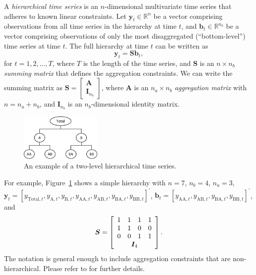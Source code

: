 \documentclass[
  11pt]{article}
\begin{document}
A \emph{hierarchical time series} is an \(n\)-dimensional multivariate
time series that adheres to known linear constraints. Let
\(\bm{y}_t \in \mathbb{R}^n\) be a vector comprising observations from
all time series in the hierarchy at time \(t\), and
\(\bm{b}_t \in \mathbb{R}^{n_b}\) be a vector comprising observations of
only the most disaggregated (``bottom-level'') time series at time
\(t\). The full hierarchy at time \(t\) can be written as \[
\bm{y}_t = \bm{S}\bm{b}_t,
\] for \(t=1,2,\ldots,T\), where \(T\) is the length of the time series,
and \(\bm{S}\) is an \(n \times n_b\) \emph{summing matrix} that defines
the aggregation constraints. We can write the summing matrix as
\(\bm{S} = \left[\begin{array}{c}\bm{A} \\ \bm{I}_{n_b}\end{array}\right]\),
where \(\bm{A}\) is an \(n_a \times n_b\) \emph{aggregation matrix} with
\(n = n_a + n_b\), and \(\bm{I}_{n_b}\) is an \(n_b\)-dimensional
identity matrix.

\begin{figure}[!t]

{\centering \includegraphics[width=0.35\textwidth,height=\textheight]{figs/hts_example.pdf}

}

\caption{\label{fig-hts}An example of a two-level hierarchical time
series.}

\end{figure}

For example, Figure~\ref{fig-hts} shows a simple hierarchy with
\(n = 7\), \(n_b = 4\), \(n_a = 3\),
\(\bm{y}_t = [y_{\text{Total},t}, y_{\text{A},t}, y_{\text{B},t}, y_{\text{AA},t}, y_{\text{AB},t}, y_{\text{BA},t}, y_{\text{BB},t}]^{\prime}\),
\(\bm{b}_t = [y_{\text{AA},t}, y_{\text{AB},t}, y_{\text{BA},t}, y_{\text{BB},t}]^{\prime}\),
and \[
\bm{S} = \left[
\begin{array}{cccc}
1 & 1 & 1 & 1 \\
1 & 1 & 0 & 0 \\
0 & 0 & 1 & 1 \\
\multicolumn{4}{c}{\bm{I}_4}
\end{array}\right].
\] The notation is general enough to include aggregation constraints
that are non-hierarchical. Please refer to \citet{Hyndman2021-fo} for
further details.
\end{document}
